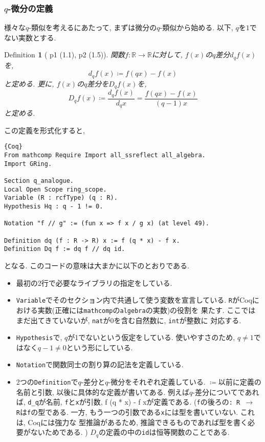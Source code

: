 \documentclass[11pt]{jarticle}
\theoremstyle{mystyle}
\newtheorem{df}{$\textrm{Definition}$}[subsubsection]
\newcommand{\bdf}{\begin{shadebox} \begin{df}}
\newcommand{\edf}{\end{df} \end{shadebox}}
\newcommand{\R}{\mathbb{R}}
\newcommand{\0}{\textbf{0}}
\newcommand{\1}{\textbf{1}}
\newcommand{\2}{\textbf{2}}
\begin{document}
\subsubsection{$q$-微分の定義}
様々な$q$-類似を考えるにあたって, まずは微分の$q$-類似から始める. 以下, $q$を$1$でない実数とする. 
\bdf[\cite{Kac} p1 (1.1), p2 (1.5)]
  関数$f : \R \to \R$に対して, $f(x)$の$q$差分$d_q f(x)$を, 
  \[
    d_q f(x) \coloneqq f (qx) - f(x)
  \]
  と定める. 更に, $f(x)$の$q$差分を$D_q f(x)$を, 
  \[
    D_q f(x) \coloneqq \frac{d_q f(x)}{d_q x} = \frac{f(qx) - f(x)}{(q - 1) x}
  \]
  と定める. 
\edf
この定義を形式化すると, 
\begin{lstlisting}{Coq}
From mathcomp Require Import all_ssreflect all_algebra.
Import GRing.

Section q_analogue.
Local Open Scope ring_scope.
Variable (R : rcfType) (q : R).
Hypothesis Hq : q - 1 != 0.

Notation "f // g" := (fun x => f x / g x) (at level 49).

Definition dq (f : R -> R) x := f (q * x) - f x.
Definition Dq f := dq f // dq id. 
\end{lstlisting}
となる. このコードの意味は大まかに以下のとおりである. 
\begin{itemize}
  \item 最初の2行で必要なライブラリの指定をしている. 
  \item {\tt Variable}でそのセクション内で共通して使う変数を宣言している. 
          {\tt R}がCoqにおける実数(正確には{\tt mathcomp}の{\tt algebra}の実数)の役割を
          果たす. ここではまだ出てきていないが, {\tt nat}が$0$を含む自然数に, {\tt int}が整数に
          対応する. 
  \item {\tt Hypothesis}で, $q$が1でないという仮定をしている. 使いやすさのため, 
          $q \ne 1$ではなく$q - 1 \ne 0$という形にしている. 
  \item {\tt Notation}で関数同士の割り算の記法を定義している. 
  \item 2つの{\tt Definition}で$q$-差分と$q$-微分をそれぞれ定義している. 
          {\tt $\coloneqq$}以前に定義の名前と引数, 以後に具体的な定義が書いてある. 
          例えば$q$-差分についてであれば, {\tt d\_q}が名前, {\tt f}と{\tt x}が引数, 
          {f (q * x) - f x}が定義である. ({\tt f}の後ろの{\tt : R $\to$ R}は{\tt f}の型である. 
          一方, もう一つの引数である{\tt x}には型を書いていない. これは, Coqには強力な
          型推論があるため, 推論できるものであれば型を書く必要がないためである. )
          $D_q$の定義の中の{\tt id}は恒等関数のことである. 
\end{itemize}
\end{document}
